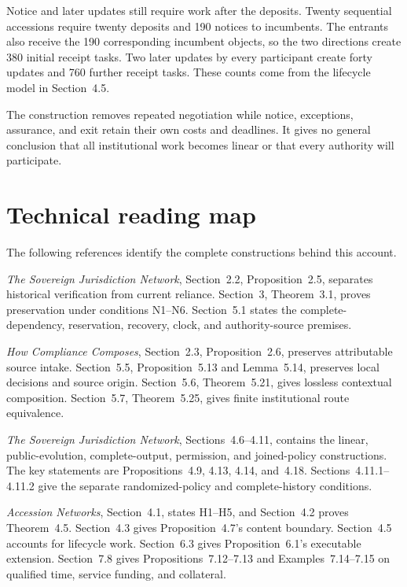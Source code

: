 \documentclass{momentum}
\begin{document}
Notice and later updates still require work after the deposits.
Twenty sequential accessions require twenty deposits and 190 notices to incumbents.
The entrants also receive the 190 corresponding incumbent objects, so the two directions create 380 initial receipt tasks.
Two later updates by every participant create forty updates and 760 further receipt tasks.
These counts come from the lifecycle model in Section~4.5.

The construction removes repeated negotiation while notice, exceptions, assurance, and exit retain their own costs and deadlines.
It gives no general conclusion that all institutional work becomes linear or that every authority will participate.

\section{Technical reading map}
\label{sec:reading}

The following references identify the complete constructions behind this account.

\begin{description}[style=nextline]
\item[Evidence and present use.]
\emph{The Sovereign Jurisdiction Network}, Section~2.2, Proposition~2.5, separates historical verification from current reliance.
Section~3, Theorem~3.1, proves preservation under conditions N1--N6.
Section~5.1 states the complete-dependency, reservation, recovery, clock, and authority-source premises.

\item[Local questions and route histories.]
\emph{How Compliance Composes}, Section~2.3, Proposition~2.6, preserves attributable source intake.
Section~5.5, Proposition~5.13 and Lemma~5.14, preserves local decisions and source origin.
Section~5.6, Theorem~5.21, gives lossless contextual composition.
Section~5.7, Theorem~5.25, gives finite institutional route equivalence.

\item[Observation and policy composition.]
\emph{The Sovereign Jurisdiction Network}, Sections~4.6--4.11, contains the linear, public-evolution, complete-output, permission, and joined-policy constructions.
The key statements are Propositions~4.9, 4.13, 4.14, and~4.18.
Sections~4.11.1--4.11.2 give the separate randomized-policy and complete-history conditions.

\item[Accession and reserved capacity.]
\emph{Accession Networks}, Section~4.1, states H1--H5, and Section~4.2 proves Theorem~4.5.
Section~4.3 gives Proposition~4.7's content boundary.
Section~4.5 accounts for lifecycle work.
Section~6.3 gives Proposition~6.1's executable extension.
Section~7.8 gives Propositions~7.12--7.13 and Examples~7.14--7.15 on qualified time, service funding, and collateral.
\end{description}
\end{document}
